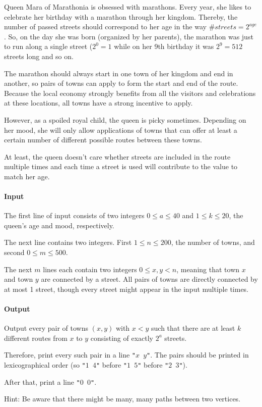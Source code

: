 




Queen Mara of Marathonia is obsessed with marathons. Every year, she likes to celebrate her birthday with a marathon through her kingdom. Thereby, the number of passed streets should correspond to her age in the way \(\#streets = 2^{age}\). So, on the day she was born (organized by her parents), the marathon was just to run along a single street (\(2^0=1\) while on her 9th birthday it was \(2^9=512\) streets long and so on.

The marathon should always start in one town of her kingdom and end in another, so pairs of towns can apply to form the start and end of the route. Because the local economy strongly benefits from all the visitors and celebrations at these locations, all towns have a strong incentive to apply.

However, as a spoiled royal child, the queen is picky sometimes. Depending on her mood, she will only allow applications of towns that can offer at least a certain number of different possible routes between these towns.

At least, the queen doesn't care whether streets are included in the route multiple times and each time a street is used will contribute to the value to match her age.

\paragraph*{Input}

The first line of input consists of two integers \(0\le a \le 40\) and \(1\le k \le 20\), the queen's age and mood, respectively.

The next line contains two integers. First \(1 \le n \le 200\), the number of towns, and second \(0\le m \le 500\). 

The next \(m\) lines each contain two integers \(0 \le x,y < n\), meaning that town \(x\) and town \(y\) are connected by a street. All pairs of towns are directly connected by at most 1 street, though every street might appear in the input multiple times.

\paragraph*{Output}
Output every pair of towns \((x,y)\) with \(x < y\) such that there are at least \(k\) different routes from \(x\) to \(y\) consisting of exactly \(2^a\) streets.

Therefore, print every such pair in a line \texttt{"\(x\) \(y\)"}. The pairs should be printed in lexicographical order (so \texttt{"\(1\) \(4\)"} before \texttt{"\(1\) \(5\)"} before \texttt{"\(2\) \(3\)"}).

After that, print a line \texttt{"\(0\) \(0\)"}.

Hint: Be aware that there might be many, many paths between two vertices.

\begin{samples}
\end{samples}

